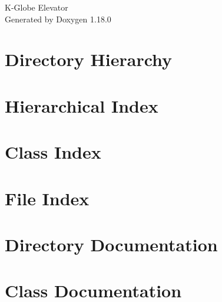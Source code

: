 \documentclass[twoside]{book}
\newcommand{\+}{\discretionary{\mbox{\scriptsize$\hookleftarrow$}}{}{}}
\newcommand{\clearemptydoublepage}{%
    \newpage{\pagestyle{empty}\cleardoublepage}%
  }
\begin{document}
  \raggedbottom
    \hypersetup{pageanchor=false,
                bookmarksnumbered=true,
                pdfencoding=unicode
               }
  \begin{titlepage}
  \vspace*{7cm}
  \begin{center}%
  {\Large K-\/\+Globe Elevator}\\
  \vspace*{1cm}
  {\large Generated by Doxygen 1.18.0}\\
  \end{center}
  \end{titlepage}
  \clearemptydoublepage
  \tableofcontents
  \clearemptydoublepage
  \hypersetup{pageanchor=true}

\chapter{Directory Hierarchy}

\chapter{Hierarchical Index}

\chapter{Class Index}

\chapter{File Index}

\chapter{Directory Documentation}










\chapter{Class Documentation}















\end{document}
